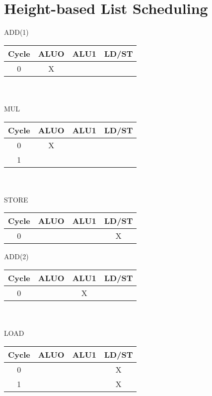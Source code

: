 \documentclass{report}
\begin{document}
\section{Height-based List Scheduling}
\vspace{-1em}
\begin{multicols}{3}
ADD(1) \\
\begin{tabular}{|c|c|c|c|}
  \hline
  Cycle & ALUO & ALU1 & LD/ST \\
  \hline
  0 & X    &      &       \\
  \hline
\end{tabular} \\ \ \\
MUL \\
\begin{tabular}{|c|c|c|c|}
  \hline
  Cycle & ALUO & ALU1 & LD/ST \\
  \hline
  0     & X    &      &       \\
  \hline
  1     &      &      &       \\
  \hline
\end{tabular} \\ \ \\
STORE \\
\begin{tabular}{|c|c|c|c|}
  \hline
  Cycle & ALUO & ALU1 & LD/ST \\
  \hline
  0     &      &      & X     \\
  \hline
\end{tabular}
  \vfill\columnbreak
ADD(2) \\
\begin{tabular}{|c|c|c|c|}
  \hline
  Cycle & ALUO & ALU1 & LD/ST \\
  \hline
  0     &      & X    &       \\
  \hline
\end{tabular} \\ \ \\
LOAD \\
\begin{tabular}{|c|c|c|c|}
  \hline
  Cycle & ALUO & ALU1 & LD/ST \\
  \hline
  0    &       &      & X     \\
  \hline 
  1    &       &      & X     \\
  \hline
\end{tabular}
  \vfill\columnbreak
  \ \\
\begin{tabular}{|c|c|c|c|}

\end{tabular}
\end{multicols}
\end{document}
